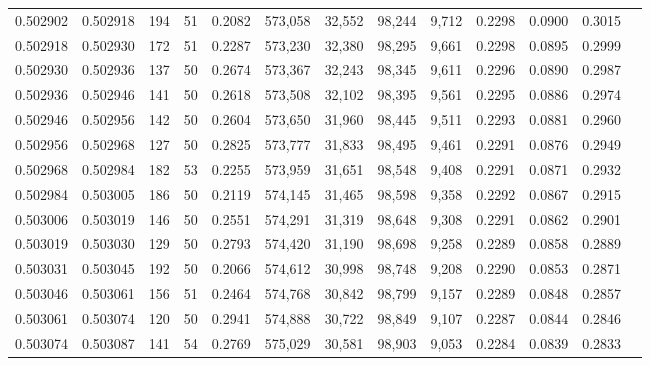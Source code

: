 \begin{tabular}{rrrrrrrrrrrrr}
0.502902 & 0.502918 & 194 &  51 &                                     0.2082 & 573,058 &  32,552 &  98,244 &   9,712 & 0.2298 & 0.0900 & 0.3015 \\
0.502918 & 0.502930 & 172 &  51 &                                     0.2287 & 573,230 &  32,380 &  98,295 &   9,661 & 0.2298 & 0.0895 & 0.2999 \\
0.502930 & 0.502936 & 137 &  50 &                                     0.2674 & 573,367 &  32,243 &  98,345 &   9,611 & 0.2296 & 0.0890 & 0.2987 \\
0.502936 & 0.502946 & 141 &  50 &                                     0.2618 & 573,508 &  32,102 &  98,395 &   9,561 & 0.2295 & 0.0886 & 0.2974 \\
0.502946 & 0.502956 & 142 &  50 &                                     0.2604 & 573,650 &  31,960 &  98,445 &   9,511 & 0.2293 & 0.0881 & 0.2960 \\
0.502956 & 0.502968 & 127 &  50 &                                     0.2825 & 573,777 &  31,833 &  98,495 &   9,461 & 0.2291 & 0.0876 & 0.2949 \\
0.502968 & 0.502984 & 182 &  53 &                                     0.2255 & 573,959 &  31,651 &  98,548 &   9,408 & 0.2291 & 0.0871 & 0.2932 \\
0.502984 & 0.503005 & 186 &  50 &                                     0.2119 & 574,145 &  31,465 &  98,598 &   9,358 & 0.2292 & 0.0867 & 0.2915 \\
0.503006 & 0.503019 & 146 &  50 &                                     0.2551 & 574,291 &  31,319 &  98,648 &   9,308 & 0.2291 & 0.0862 & 0.2901 \\
0.503019 & 0.503030 & 129 &  50 &                                     0.2793 & 574,420 &  31,190 &  98,698 &   9,258 & 0.2289 & 0.0858 & 0.2889 \\
0.503031 & 0.503045 & 192 &  50 &                                     0.2066 & 574,612 &  30,998 &  98,748 &   9,208 & 0.2290 & 0.0853 & 0.2871 \\
0.503046 & 0.503061 & 156 &  51 &                                     0.2464 & 574,768 &  30,842 &  98,799 &   9,157 & 0.2289 & 0.0848 & 0.2857 \\
0.503061 & 0.503074 & 120 &  50 &                                     0.2941 & 574,888 &  30,722 &  98,849 &   9,107 & 0.2287 & 0.0844 & 0.2846 \\
0.503074 & 0.503087 & 141 &  54 &                                     0.2769 & 575,029 &  30,581 &  98,903 &   9,053 & 0.2284 & 0.0839 & 0.2833 \\

\end{tabular}
